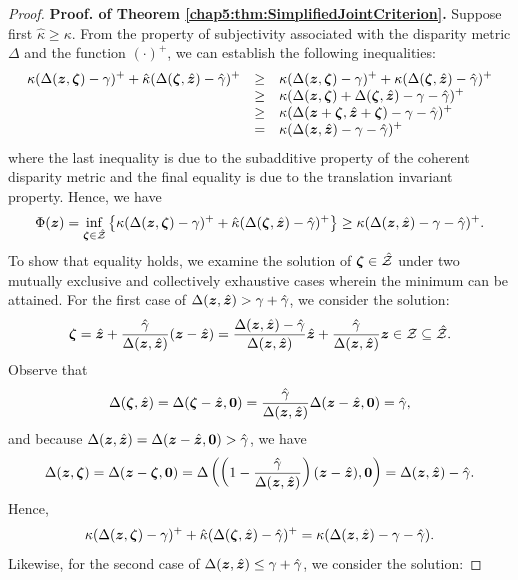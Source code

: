 \documentclass[mnsc, nonblindrev]{informswp}
\newcommand{\1}[1]{\mathds{1}{\left(#1\right)}}
\begin{document}
\begin{appendices}
\begin{proof}{\bf Proof. of Theorem \ref{chap5:thm:SimplifiedJointCriterion}.}
Suppose first $\hat \kappa \geq \kappa$. From the property of subjectivity associated with the disparity metric $\Delta$ and the function $(\cdot)^+$, we can establish the following inequalities:
$$
\begin{array}{rcl}
\displaystyle \kappa (  \Delta(\bm z,\bm \zeta) - \gamma)^+ + \hat \kappa ( \Delta(\bm \zeta,\hat{\bm{z}}) - \hat \gamma)^+ 
&\geq&  \displaystyle \kappa (  \Delta(\bm z,\bm \zeta) - \gamma)^+ +  \kappa ( \Delta(\bm \zeta,\hat{\bm{z}}) - \hat \gamma)^+\\
&\geq&  \displaystyle \kappa ( \Delta(\bm z,\bm \zeta) + \Delta(\bm \zeta,\hat{\bm{z}}) - \gamma - \hat \gamma)^+ \\
&\geq&  \displaystyle \kappa ( \Delta(\bm z+\bm \zeta,\hat{\bm{z}}+ \bm \zeta) - \gamma - \hat \gamma)^+ \\
&=&  \displaystyle \kappa ( \Delta(\bm{z},\hat{\bm{z}}) - \gamma - \hat \gamma)^+ 
\end{array}
$$
where the last inequality is due to the subadditive property of the coherent disparity metric and the final equality is due to the translation invariant property. Hence, we have 
$$
\Phi(\bm z) = \inf_{\bm \zeta  \in  \hat {\mathcal{Z}}} \left\{ \kappa (  \Delta(\bm z,\bm \zeta) - \gamma)^+ + \hat \kappa ( \Delta(\bm \zeta,\hat{\bm{z}}) - \hat \gamma)^+ \right\} \geq  \kappa( \Delta(\bm z,\hat{\bm{z}}) - \gamma -\hat \gamma)^+.
$$
To show that equality holds, we examine the solution of $\bm \zeta  \in  \hat {\mathcal{Z}}$ under two mutually exclusive and collectively exhaustive cases wherein the minimum can be attained. For the first case of $\Delta(\bm z,\hat{\bm{z}})> \gamma + \hat \gamma$, we consider the solution:
$$
\bm \zeta = \hat{\bm{z}} + \frac{\hat \gamma}{\Delta(\bm z,\hat{\bm{z}})}(\bm z - \hat{\bm{z}}) = \frac{\Delta(\bm z,\hat{\bm{z}}) - \hat \gamma}{\Delta(\bm z,\hat{\bm{z}})}\hat{\bm{z}} +  \frac{\hat \gamma}{\Delta(\bm z,\hat{\bm{z}})}\bm z \in \mathcal{Z} \subseteq \hat {\mathcal{Z}}. 
$$
Observe that 
$$
\Delta(\bm \zeta,\hat{\bm{z}}) = \Delta(\bm \zeta-\hat{\bm{z}},\bm 0) = \frac{\hat \gamma}{\Delta(\bm z,\hat{\bm{z}})}  \Delta(\bm z-\hat{\bm{z}},\bm 0) =  \hat \gamma,
$$
and because $\Delta(\bm z,\hat{\bm{z}})=\Delta(\bm z-\hat{\bm{z}},\bm 0)> \hat \gamma$, we have 
$$
\Delta(\bm z,\bm \zeta)= \Delta(\bm z - \bm \zeta, \bm 0) = \Delta\left( \left( 1- \frac{\hat \gamma}{\Delta(\bm z,\hat{\bm{z}})}\right)(\bm z - \hat{\bm{z}}),\bm 0\right) = \Delta(\bm z,\hat{\bm{z}}) - \hat \gamma.
$$
Hence,
$$
\kappa (  \Delta(\bm z,\bm \zeta) - \gamma)^+ + \hat \kappa ( \Delta(\bm \zeta,\hat{\bm{z}}) - \hat \gamma)^+ =  \kappa( \Delta(\bm z,\hat{\bm{z}}) - \gamma -\hat \gamma). 
$$
Likewise, for the second case of $\Delta(\bm z,\hat{\bm{z}})\leq \gamma + \hat \gamma$, we consider the solution:

\end{proof}
\end{appendices}
\end{document}
